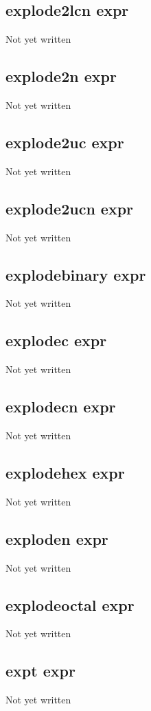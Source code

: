 \documentclass[a4paper,11pt]{article}
\begin{document}
{\subsection{\ttfamily explode2lcn expr}
   Not yet written

\subsection{\ttfamily explode2n expr}
   Not yet written

\subsection{\ttfamily explode2uc expr}
   Not yet written

\subsection{\ttfamily explode2ucn expr}
   Not yet written

\subsection{\ttfamily explodebinary expr}
   Not yet written

\subsection{\ttfamily explodec expr}
   Not yet written

\subsection{\ttfamily explodecn expr}
   Not yet written

\subsection{\ttfamily explodehex expr}
   Not yet written

\subsection{\ttfamily exploden expr}
   Not yet written

\subsection{\ttfamily explodeoctal expr}
   Not yet written

\subsection{\ttfamily expt expr}
   Not yet written

}
\end{document}
